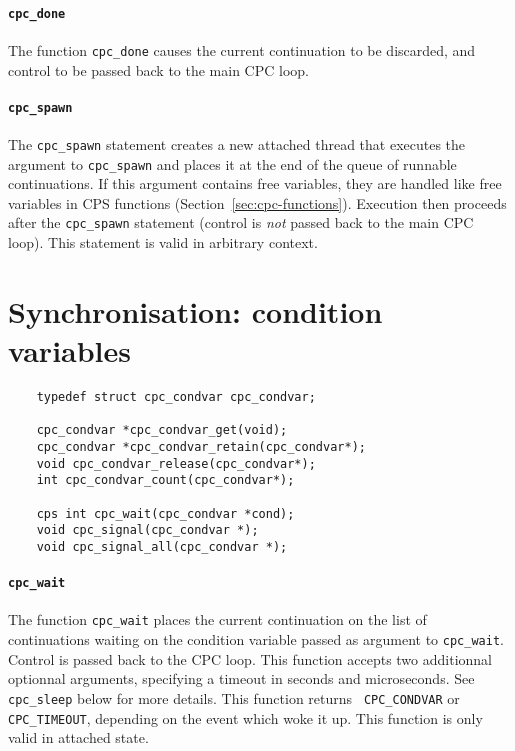 \documentclass[a4paper]{report}
\begin{document}
\paragraph{\tt cpc\_done} The function {\tt cpc\_done} causes the
current continuation to be discarded, and control to be passed back to
the main CPC loop.

\paragraph{\tt cpc\_spawn} The {\tt cpc\_spawn} statement creates a new
attached thread that executes the argument to {\tt cpc\_spawn} and
places it at the end of the queue of runnable continuations.  If this
argument contains free variables, they are handled like free variables
in CPS functions (Section~\ref{sec:cpc-functions}). Execution then
proceeds after the {\tt cpc\_spawn} statement (control is {\em not\/}
passed back to the main CPC loop).  This statement is valid in arbitrary
context.

\section{Synchronisation: condition variables}

\begin{verbatim}
    typedef struct cpc_condvar cpc_condvar;

    cpc_condvar *cpc_condvar_get(void);
    cpc_condvar *cpc_condvar_retain(cpc_condvar*);
    void cpc_condvar_release(cpc_condvar*);
    int cpc_condvar_count(cpc_condvar*);

    cps int cpc_wait(cpc_condvar *cond);
    void cpc_signal(cpc_condvar *);
    void cpc_signal_all(cpc_condvar *);
\end{verbatim}

\paragraph{\tt cpc\_wait} The function {\tt cpc\_wait} places the
current continuation on the list of continuations waiting on the
condition variable passed as argument to {\tt cpc\_wait}.  Control is
passed back to the CPC loop.  This function accepts two additionnal
optionnal arguments, specifying a timeout in seconds and microseconds.  
See {\tt cpc\_sleep} below for more details.  This function returns {\tt
CPC\_CONDVAR} or {\tt CPC\_TIMEOUT}, depending on the event which woke
it up.  This function is only valid in attached state.
\end{document}
